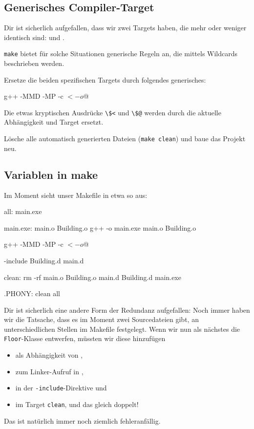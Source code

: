 \subsection{Generisches Compiler-Target}

Dir ist sicherlich aufgefallen, dass wir zwei Targets haben, die mehr oder weniger identisch sind:  und .

\texttt{make} bietet für solche Situationen generische Regeln an, die mittels Wildcards beschrieben werden.

Ersetze die beiden spezifischen Targets durch folgendes generisches:
\begin{lstmake}
    g++ -MMD -MP -c $< -o $@
\end{lstmake}
Die etwas kryptischen Ausdrücke \lstinline{\$<} und \lstinline{\$@} werden durch die aktuelle Abhängigkeit und Target ersetzt.

Lösche alle automatisch generierten Dateien (\texttt{make clean}) und baue das Projekt neu.

\subsection{Variablen in make}

Im Moment sieht unser Makefile in etwa so aus:
\begin{lstmake}
all: main.exe

main.exe: main.o Building.o
    g++ -o main.exe main.o Building.o

    g++ -MMD -MP -c $< -o $@

-include Building.d main.d

clean:
    rm -rf main.o Building.o main.d Building.d main.exe
    
.PHONY: clean all
\end{lstmake}

Dir ist sicherlich eine andere Form der Redundanz aufgefallen:
Noch immer haben wir die Tatsache, dass es im Moment zwei Sourcedateien gibt, an unterschiedlichen Stellen im Makefile festgelegt.
Wenn wir nun als nächstes die \lstinline{Floor}-Klasse entwerfen, müssten wir diese hinzufügen
\begin{itemize}
    \item als Abhängigkeit von ,
    \item zum Linker-Aufruf in ,
    \item in der \lstinline{-include}-Direktive und
    \item im Target \lstinline{clean}, und das gleich doppelt!
\end{itemize}
Das ist natürlich immer noch ziemlich fehleranfällig.

